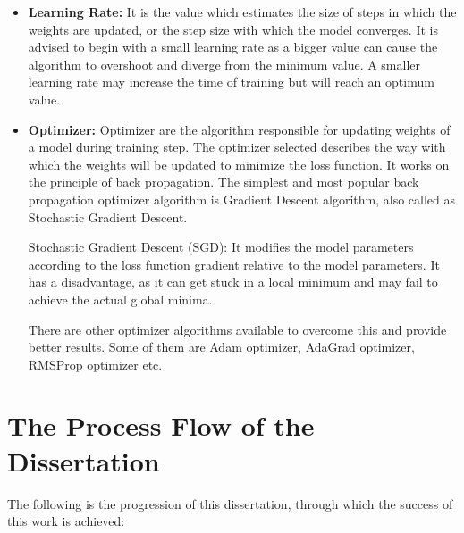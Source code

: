\begin{itemize}
    \item \textbf{Learning Rate:} It is the value which estimates the size of steps in which the weights are updated, or the step size with which the model converges. It is advised to begin with a small learning rate as a bigger value can cause the algorithm to overshoot and diverge from the minimum value. A smaller learning rate may increase the time of training but will reach an optimum value.
    
    \item \textbf{Optimizer:} Optimizer are the algorithm responsible for updating weights of a model during training step. The optimizer selected describes the way with which the weights will be updated to minimize the loss function. It works on the principle of back propagation. The simplest and most popular back propagation optimizer algorithm is Gradient Descent algorithm, also called as Stochastic Gradient Descent.

    \par
    Stochastic Gradient Descent (SGD): It modifies the model parameters according to the loss function gradient relative to the model parameters. It has a disadvantage, as it can get stuck in a local minimum and may fail to achieve the actual global minima.

    \par
    There are other optimizer algorithms available to overcome this and provide better results. Some of them are Adam optimizer, AdaGrad optimizer, RMSProp optimizer etc.
\end{itemize}

\section{The Process Flow of the Dissertation}
The following is the progression of this dissertation, through which the success of this work is achieved:

